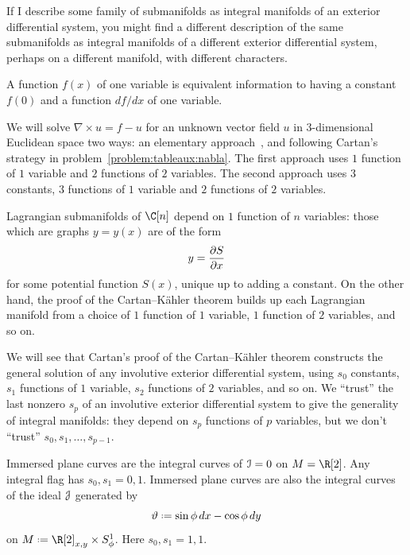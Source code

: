 %
If I describe some family of submanifolds as integral manifolds of an exterior differential system, you might find a different description of the same submanifolds as integral manifolds of a different exterior differential system, perhaps on a different manifold, with different characters.
\begin{example} 
A function \(f(x)\) of one variable is equivalent information to having a constant \(f(0)\) and a function \(df/dx\) of one variable.
\end{example}
\begin{example}
We will solve \(\nabla \times u=f-u\) for an unknown vector field \(u\) in \(3\)-dimensional Euclidean space two ways: an elementary approach~, and following Cartan's strategy in problem~\vref{problem:tableaux:nabla}.
The first approach uses \(1\) function of \(1\) variable and \(2\) functions of \(2\) variables.
The second approach uses \(3\) constants, \(3\) functions of \(1\) variable and \(2\) functions of \(2\) variables.
\end{example}
\begin{example}
Lagrangian submanifolds of \(\C[n]\) depend on \(1\) function of \(n\) variables: those which are graphs \(y=y(x)\) are of the form
\[
y = \pderiv{S}{x}
\]
for some potential function \(S(x)\), unique up to adding a constant.
On the other hand, the proof of the Cartan--K\"ahler theorem builds up each Lagrangian manifold from a choice of \(1\) function of \(1\) variable, \(1\) function of \(2\) variables, and so on.
\end{example}
We will see that Cartan's proof of the Cartan--K\"ahler theorem constructs the general solution of any involutive exterior differential system, using \(s_0\) constants, \(s_1\) functions of \(1\) variable, \(s_2\) functions of \(2\) variables, and so on.
We ``trust'' the last nonzero \(s_p\) of an involutive exterior differential system to give the generality of integral manifolds: they depend on \(s_p\) functions of \(p\) variables, but we don't ``trust'' \(s_0, s_1, \dots, s_{p-1}\).
\begin{example}Immersed plane curves are the integral curves of \(\mathcal{I}=0\) on \(M=\R[2]\).
Any integral flag has \(s_0,s_1=0,1\).
Immersed plane curves are also the integral curves of the ideal \(\mathcal{J}\) generated by
\[
\vartheta \defeq \sin \phi \, dx - \cos \phi \, dy
\]
on \(M\defeq \R[2]_{x,y} \times S^1_{\phi}\).
Here \(s_0,s_1=1,1\).
\end{example}


